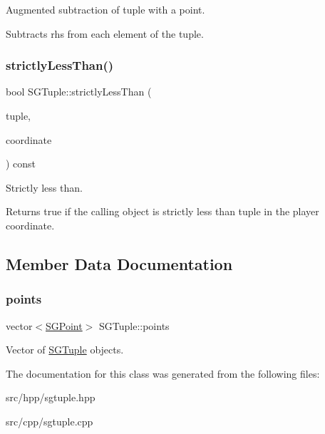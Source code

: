 Augmented subtraction of tuple with a point. 

Subtracts rhs from each element of the tuple. \mbox{\label{classSGTuple_a4f196f1674d10e9d6cbe3b20c56a2cbd}} 
\subsubsection{\texorpdfstring{strictly\+Less\+Than()}{strictlyLessThan()}}
{\footnotesize\ttfamily bool S\+G\+Tuple\+::strictly\+Less\+Than (\begin{DoxyParamCaption}\item[{const \hyperlink{classSGTuple}{S\+G\+Tuple} \&}]{tuple,  }\item[{int}]{coordinate }\end{DoxyParamCaption}) const}



Strictly less than. 

Returns true if the calling object is strictly less than tuple in the player coordinate. 

\subsection{Member Data Documentation}
\mbox{\label{classSGTuple_a2d9f4a67e7230c46d189eb4472417255}} 
\subsubsection{\texorpdfstring{points}{points}}
{\footnotesize\ttfamily vector$<$\hyperlink{classSGPoint}{S\+G\+Point}$>$ S\+G\+Tuple\+::points\hspace{0.3cm}{\ttfamily [private]}}

Vector of \hyperlink{classSGTuple}{S\+G\+Tuple} objects. 

The documentation for this class was generated from the following files\+:\begin{DoxyCompactItemize}
\item 
src/hpp/sgtuple.\+hpp\item 
src/cpp/sgtuple.\+cpp\end{DoxyCompactItemize}
